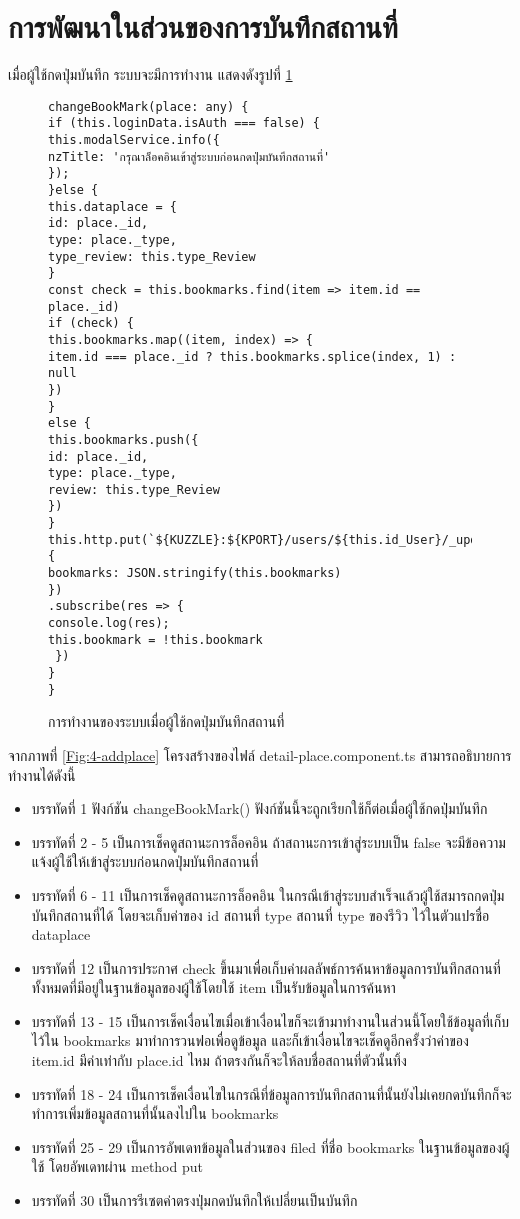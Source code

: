 \section{การพัฒนาในส่วนของการบันทึกสถานที่}
เมื่อผู้ใช้กดปุ่มบันทึก ระบบจะมีการทำงาน แสดงดังรูปที่ \ref{Fig:4-bookmark}
\begin{figure}[H]
{\lstset{language=Pascal}
\begin{lstlisting}
changeBookMark(place: any) {
if (this.loginData.isAuth === false) {
this.modalService.info({
nzTitle: 'กรุณาล็อคอินเข้าสู่ระบบก่อนกดปุ่มบันทึกสถานที่'
});
}else {
this.dataplace = {
id: place._id,
type: place._type,
type_review: this.type_Review
}
const check = this.bookmarks.find(item => item.id == place._id)
if (check) {
this.bookmarks.map((item, index) => {
item.id === place._id ? this.bookmarks.splice(index, 1) : null 
})
}
else {
this.bookmarks.push({
id: place._id,
type: place._type,
review: this.type_Review
})
}
this.http.put(`${KUZZLE}:${KPORT}/users/${this.id_User}/_update`, {
bookmarks: JSON.stringify(this.bookmarks)
})
.subscribe(res => {
console.log(res);
this.bookmark = !this.bookmark
 })
}
}
\end{lstlisting}}
\caption{การทำงานของระบบเมื่อผู้ใช้กดปุ่มบันทึกสถานที่}
\label{Fig:4-bookmark}
\end{figure}
\newpage
จากภาพที่ \ref{Fig:4-addplace} โครงสร้างของไฟล์ detail-place.component.ts สามารถอธิบายการทำงานได้ดังนี้
\begin{itemize}[label={--}]
\item บรรทัดที่ 1 ฟังก์ชัน changeBookMark() ฟังก์ชันนี้จะถูกเรียกใช้ก็ต่อเมื่อผู้ใช้กดปุ่มบันทึก
\item บรรทัดที่ 2 - 5 เป็นการเช็คดูสถานะการล็อคอิน ถ้าสถานะการเข้าสู่ระบบเป็น false จะมีข้อความแจ้งผู้ใช้ให้เข้าสู่ระบบก่อนกดปุ่มบันทึกสถานที่
\item บรรทัดที่ 6 - 11 เป็นการเช็คดูสถานะการล็อคอิน ในกรณีเข้าสู่ระบบสำเร็จแล้วผู้ใช้สมารถกดปุ่มบันทึกสถานที่ได้ โดยจะเก็บค่าของ id สถานที่ type สถานที่ type ของรีวิว ไว้ในตัวแปรชื่อ dataplace 
\item บรรทัดที่ 12 เป็นการประกาศ check ขึ้นมาเพื่อเก็บค่าผลลัพธ์การค้นหาข้อมูลการบันทึกสถานที่ทั้งหมดที่มีอยู่ในฐานข้อมูลของผู้ใช้โดยใช้ item เป็นรับข้อมูลในการค้นหา
\item บรรทัดที่ 13 - 15 เป็นการเช็คเงื่อนไขเมื่อเข้าเงื่อนไขก็จะเข้ามาทำงานในส่วนนี้โดยใช้ข้อมูลที่เก็บไว้ใน bookmarks มาทำการวนฟอเพื่อดูข้อมูล และก็เข้าเงื่อนไขจะเช็คดูอีกครั้งว่าค่าของ item.id มีค่าเท่ากับ place.id ไหม ถ้าตรงกันก็จะให้ลบชื่อสถานที่ตัวนั้นทิ้ง
\item บรรทัดที่ 18 - 24 เป็นการเช็คเงื่อนไขในกรณีที่ข้อมูลการบันทึกสถานที่นั้นยังไม่เคยกดบันทึกก็จะทำการเพิ่มข้อมูลสถานที่นั้นลงไปใน bookmarks
\item บรรทัดที่ 25 - 29 เป็นการอัพเดทข้อมูลในส่วนของ filed ที่ชื่อ bookmarks ในฐานข้อมูลของผู้ใช้ โดยอัพเดทผ่าน method put 
\item บรรทัดที่ 30 เป็นการรีเซตค่าตรงปุ่มกดบันทึกให้เปลี่ยนเป็นบันทึก
\end{itemize}
\newpage

